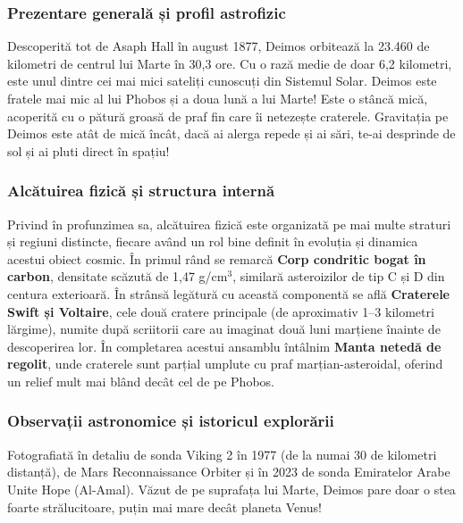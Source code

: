 \subsubsection*{Prezentare generală și profil astrofizic}
Descoperită tot de Asaph Hall în august 1877, Deimos orbitează la 23.460 de kilometri de centrul lui Marte în 30,3 ore. Cu o rază medie de doar 6,2 kilometri, este unul dintre cei mai mici sateliți cunoscuți din Sistemul Solar. Deimos este fratele mai mic al lui Phobos și a doua lună a lui Marte! Este o stâncă mică, acoperită cu o pătură groasă de praf fin care îi netezește craterele. Gravitația pe Deimos este atât de mică încât, dacă ai alerga repede și ai sări, te-ai desprinde de sol și ai pluti direct în spațiu!

\subsubsection*{Alcătuirea fizică și structura internă}
Privind în profunzimea sa, alcătuirea fizică este organizată pe mai multe straturi și regiuni distincte, fiecare având un rol bine definit în evoluția și dinamica acestui obiect cosmic. În primul rând se remarcă \textbf{Corp condritic bogat în carbon}, densitate scăzută de 1,47 g/cm$^3$, similară asteroizilor de tip C și D din centura exterioară. În strânsă legătură cu această componentă se află \textbf{Craterele Swift și Voltaire}, cele două cratere principale (de aproximativ 1--3 kilometri lărgime), numite după scriitorii care au imaginat două luni marțiene înainte de descoperirea lor. În completarea acestui ansamblu întâlnim \textbf{Manta netedă de regolit}, unde craterele sunt parțial umplute cu praf marțian-asteroidal, oferind un relief mult mai blând decât cel de pe Phobos.

\subsubsection*{Observații astronomice și istoricul explorării}
Fotografiată în detaliu de sonda Viking 2 în 1977 (de la numai 30 de kilometri distanță), de Mars Reconnaissance Orbiter și în 2023 de sonda Emiratelor Arabe Unite \guillemotleft{}Hope\guillemotright{} (Al-Amal). Văzut de pe suprafața lui Marte, Deimos pare doar o stea foarte strălucitoare, puțin mai mare decât planeta Venus!

